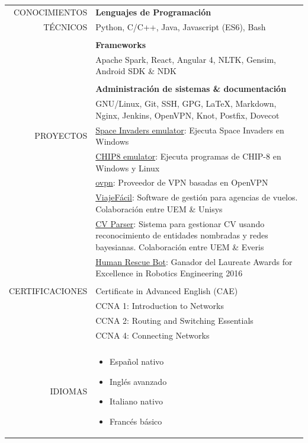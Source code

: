 \documentclass[a4paper, 12pt]{article}
\begin{document}
\begin{longtable}{r|p{12cm}}
    CONOCIMIENTOS
    & \textbf{Lenguajes de Programación}
    \\
    TÉCNICOS
    & Python, C/C++, Java, Javascript (ES6), Bash
    \\\\
    & \textbf{Frameworks}
    \\
    & Apache Spark, React, Angular 4, NLTK, Gensim, Android SDK \& NDK
    \\\\
    & \textbf{Administración de sistemas \& documentación}
    \\
    & GNU/Linux, Git, SSH, GPG, \LaTeX, Markdown, Nginx, Jenkins, OpenVPN, Knot, Postfix, Dovecot
    \\\pagebreak
    PROYECTOS
    & \href{https://github.com/hugo19941994/space-invaders-emu}{Space Invaders emulator}: Ejecuta Space Invaders en Windows
    \\
    & \href{https://github.com/hugo19941994/chip8-emu}{CHIP8 emulator}: Ejecuta programas de CHIP-8 en Windows y Linux
    \\
    & \href{https://vpn.hugofs.com}{ovpn}: Proveedor de VPN basadas en OpenVPN
    \\
    & \href{https://github.com/hugo19941994/ViajeFacil}{ViajeFácil}: Software de gestión para agencias de vuelos. Colaboración entre UEM \& Unisys
    \\
    & \href{https://github.com/hugo19941994/cv-parser}{CV Parser}: Sistema para gestionar CV usando reconocimiento de entidades nombradas y redes bayesianas. Colaboración entre UEM \& Everis
    \\
    & \href{https://github.com/hugo19941994/robot}{Human Rescue Bot}: Ganador del Laureate Awards for Excellence in Robotics Engineering 2016
    \\\\
    CERTIFICACIONES
    & Certificate in Advanced English (CAE)
    \\
    & CCNA 1: Introduction to Networks
    \\
    & CCNA 2: Routing and Switching Essentials
    \\
    & CCNA 4: Connecting Networks
    \\\\
    IDIOMAS
    & \vspace{-1.85\baselineskip} %
    \begin{multicols}{2}
        \begin{itemize}[leftmargin=0cm, label={}, noitemsep]
            \item Español nativo
            \item Inglés avanzado
            \item Italiano nativo
            \item Francés básico
        \end{itemize}
    \end{multicols}
\end{longtable}
\end{document}
